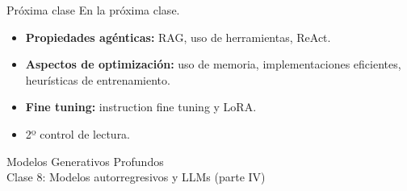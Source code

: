 \documentclass{beamer}
\begin{document}
\begin{frame}{Próxima clase}
    En la próxima clase.
    \begin{itemize}
        \item \textbf{Propiedades agénticas:} RAG, uso de herramientas, ReAct.
        \item \textbf{Aspectos de optimización:} uso de memoria, implementaciones eficientes, heurísticas de entrenamiento.
        \item \textbf{Fine tuning:} instruction fine tuning y LoRA.
        \item 2º control de lectura.
    \end{itemize}
\end{frame}

\begin{frame}
    \centering
    \Large{Modelos Generativos Profundos}\\
    \large{Clase 8: Modelos autorregresivos y LLMs (parte IV)}
\end{frame}
\end{document}
